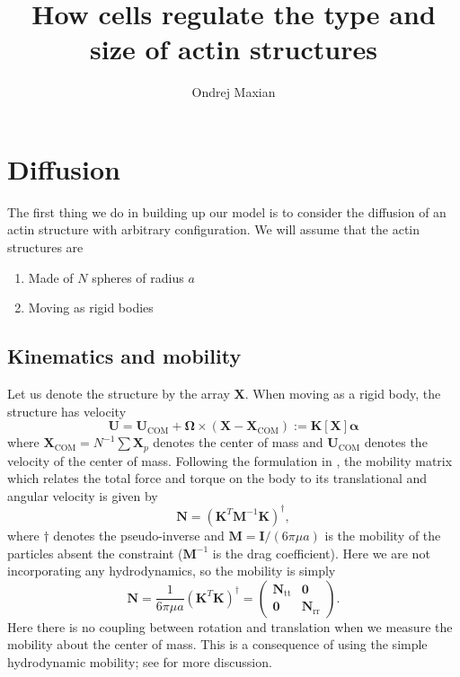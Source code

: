 \documentclass[11pt]{article}
\title{How cells regulate the type and size of actin structures  \vspace{-0.5 cm}}
\author{Ondrej Maxian  \vspace{-0.75 cm}}
\newcommand{\V}[1]{\boldsymbol{#1}}                 %
\newcommand{\M}[1]{\boldsymbol{#1}}
\begin{document}
\maketitle

\section{Diffusion \label{sec:Diff}}
The first thing we do in building up our model is to consider the diffusion of an actin structure with arbitrary configuration. We will assume that the actin structures are
\begin{enumerate}
\item Made of $N$ spheres of radius $a$
\item Moving as rigid bodies
\end{enumerate}

\subsection{Kinematics and mobility}
Let us denote the structure by the array $\V{X}$. When moving as a rigid body, the structure has velocity 
\begin{equation}
\V{U} = \V{U}_\text{COM}+\V{\Omega} \times \left(\V{X}-\V{X}_\text{COM}\right):=\M{K}[\V{X}]\V{\alpha}
\end{equation}
where $\V{X}_\text{COM}=N^{-1} \sum \V{X}_p$ denotes the center of mass and $\V{U}_\text{COM}$ denotes the velocity of the center of mass. Following the formulation in \cite{delong2015brownian}, the mobility matrix which relates the total force and torque on the body to its translational and angular velocity is given by 
\begin{equation}
\M{N} = \left(\M{K}^T \M{M}^{-1} \M{K}\right)^\dagger,
\end{equation}
where $\dagger$ denotes the pseudo-inverse and $\M{M}=\M{I}/(6\pi \mu a)$ is the mobility of the particles absent the constraint ($\M{M}^{-1}$ is the drag coefficient). Here we are not incorporating any hydrodynamics, so the mobility is simply 
\begin{equation}
\M{N} =\frac{1}{6 \pi \mu a} \left(\M{K}^T \M{K}\right)^\dagger = \begin{pmatrix} \M{N}_\text{tt} & \M{0} \\ \M{0} & \M{N}_\text{rr} \end{pmatrix}.
\end{equation}
Here there is no coupling between rotation and translation when we measure the mobility about the center of mass. This is a consequence of using the simple hydrodynamic mobility; see \cite[Sec.~IV(A)]{delong2015brownian} for more discussion.
\end{document}
